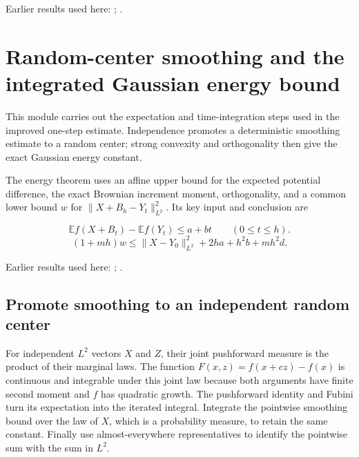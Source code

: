 \documentclass[11pt,a4paper]{report}
\begin{document}
Earlier results used here: \cite[Section~3.13.2]{LangevinLean2026ULASC}; \cite[Section~3.13.5]{LangevinLean2026ULASC}.
\section{\texorpdfstring{Random-center smoothing and the integrated Gaussian energy bound}{Random-center smoothing and the integrated Gaussian energy bound}}
\label{proof-module-AverageLMC-GaussianPerturbation-lean}


This module carries out the expectation and time-integration steps used in the improved one-step estimate. Independence promotes a deterministic smoothing estimate to a random center; strong convexity and orthogonality then give the exact Gaussian energy constant.



The energy theorem uses an affine upper bound for the expected potential difference, the exact Brownian increment moment, orthogonality, and a common lower bound \(w\) for \(\|X+B_h-Y_t\|_{L^2}^2\). Its key input and conclusion are


\[\mathbb Ef(X+B_t)-\mathbb Ef(Y_t)\le a+bt\qquad(0\le t\le h).\]
\[(1+mh)w\le\|X-Y_0\|_{L^2}^{2}+2ha+h^2b+mh^2d.\]

Earlier results used here: \cite[Section~3.18]{LangevinLean2026Proximal}; \cite[Section~3.45]{LangevinLean2026ULASC}.
\subsection{\texorpdfstring{Promote smoothing to an independent random center}{Promote smoothing to an independent random center}}
\label{report-step-AverageLMC-GaussianPerturbation-lean-1}


For independent \(L^{2}\) vectors \(X\) and \(Z\), their joint pushforward measure is the product of their marginal laws. The function \(F(x,z)=f(x+cz)-f(x)\) is continuous and integrable under this joint law because both arguments have finite second moment and \(f\) has quadratic growth. The pushforward identity and Fubini turn its expectation into the iterated integral. Integrate the pointwise smoothing bound over the law of \(X\), which is a probability measure, to retain the same constant. Finally use almost-everywhere representatives to identify the pointwise sum with the sum in \(L^{2}\).
\end{document}

